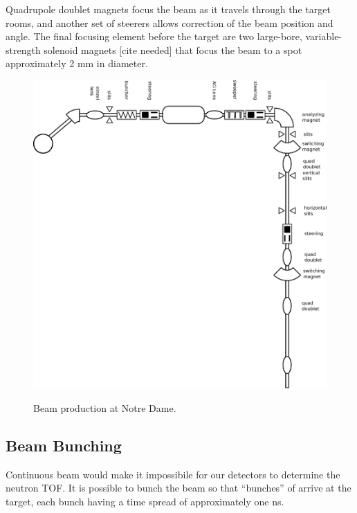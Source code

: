 Quadrupole doublet magnets focus the beam as it travels through the target rooms, and another set of steerers allows correction of the beam position and angle.  The final focusing element before the target are two large-bore, variable-strength solenoid magnets [cite needed] that focus the beam to a spot approximately 2 mm in diameter.

\begin{figure}[htp]
\centering
\includegraphics[width=1.0\textwidth]{figures/NSL_beamline.eps}
\label{fig:beamline}
\caption{Beam production at Notre Dame.}
\end{figure}

\subsection{Beam Bunching}

Continuous beam would make it impossibile for our detectors to determine the neutron TOF.  It is possible to bunch the beam so that ``bunches'' of  arrive at the target, each bunch having a time spread of approximately one ns.  


